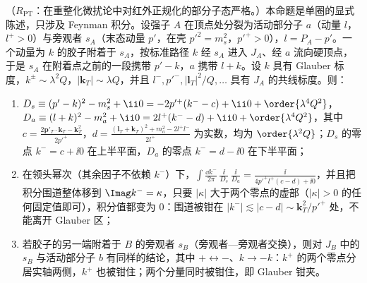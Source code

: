 \begin{proposition}\label{prop:dy-glauber-pinch}
（$R_{\mathrm{PT}}$：在重整化微扰论中对红外正规化的部分子态严格。）本命题是单圈的显式陈述，只涉及 Feynman 积分。设强子 $A$ 在顶点处分裂为活动部分子 $a$（动量 $l$，$l^+>0$）与旁观者 $s_A$（末态动量 $p'$，在壳 $p'^2=m_s^2$，$p'^+>0$），$l=P_A-p'$。一个动量为 $k$ 的胶子附着于 $s_A$，按标准路径 $k$ 经 $s_A$ 进入 $J_A$、经 $a$ 流向硬顶点，于是 $s_A$ 在附着点之前的一段携带 $p'-k$，$a$ 携带 $l+k$。设 $k$ 具有 Glauber 标度，$k^\pm\sim\lambda^2Q$，$|\mathbf k_T|\sim\lambda Q$，并且 $l^-,p'^-,|\mathbf l_T|^2/Q,\dots$ 具有 $J_A$ 的共线标度。则：
\begin{enumerate}[label=(\alph*),leftmargin=2.2em,itemsep=1pt,topsep=2pt]
\item $D_s\equiv(p'-k)^2-m_s^2+\ii0=-2p'^+(k^--c)+\ii0+\order{\lambda^4Q^2}$，$D_a\equiv(l+k)^2-m_a^2+\ii0=2l^+(k^--d)+\ii0+\order{\lambda^4Q^2}$，其中
$c=\frac{2\mathbf p'_T\cdot\mathbf k_T-\mathbf k_T^2}{2p'^+}$，$d=\frac{(\mathbf l_T+\mathbf k_T)^2+m_a^2-2l^+l^-}{2l^+}$ 为实数，均为 $\order{\lambda^2Q}$；$D_s$ 的零点 $k^-=c+\ii0$ 在上半平面，$D_a$ 的零点 $k^-=d-\ii0$ 在下半平面；
\item 在领头幂次（其余因子不依赖 $k^-$）下，$\displaystyle\int\frac{\dd k^-}{2\pi}\,\frac{\ii}{D_s}\,\frac{\ii}{D_a}=\frac{\ii}{4p'^+l^+(c-d)+\ii0}$，并且把积分围道整体移到 $\Imag k^-=\kappa$，只要 $|\kappa|$ 大于两个零点的虚部（$|\kappa|>0$ 的任何固定值即可），积分值都变为 $0$：围道被钳在 $|k^-|\lesssim|c-d|\sim\mathbf k_T^2/p'^+$ 处，不能离开 Glauber 区；
\item 若胶子的另一端附着于 $B$ 的旁观者 $s_B$（旁观者—旁观者交换），则对 $J_B$ 中的 $s_B$ 与活动部分子 $b$ 有同样的结论，其中 $+\leftrightarrow-$、$k\to-k$：$k^+$ 的两个零点分居实轴两侧，$k^+$ 也被钳住；两个分量同时被钳住，即 Glauber 钳夹。
\end{enumerate}
\end{proposition}

